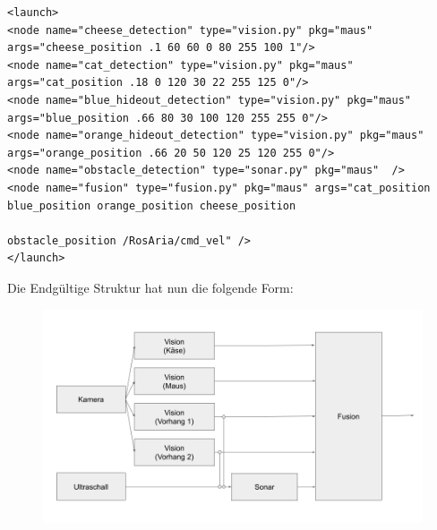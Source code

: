 \documentclass[11pt,a4paper]{article}
\begin{document}
\begin{tiny}
\begin{linenumbers}
\begin{lstlisting}
<launch>
<node name="cheese_detection" type="vision.py" pkg="maus" args="cheese_position .1 60 60 0 80 255 100 1"/>
<node name="cat_detection" type="vision.py" pkg="maus" args="cat_position .18 0 120 30 22 255 125 0"/>
<node name="blue_hideout_detection" type="vision.py" pkg="maus" args="blue_position .66 80 30 100 120 255 255 0"/>
<node name="orange_hideout_detection" type="vision.py" pkg="maus" args="orange_position .66 20 50 120 25 120 255 0"/>
<node name="obstacle_detection" type="sonar.py" pkg="maus"  />
<node name="fusion" type="fusion.py" pkg="maus" args="cat_position blue_position orange_position cheese_position 
                                                      obstacle_position /RosAria/cmd_vel" /> 
</launch>

\end{lstlisting}

\end{linenumbers}
\end{tiny}
Die Endgültige Struktur hat nun die folgende Form:
\begin{figure}[H]
\centering
\includegraphics[width=\textwidth]{media/struktur.png}
\end{figure}
\newpage


\end{document}
